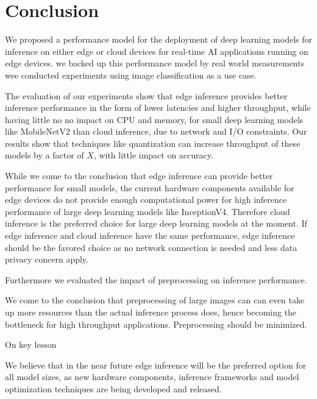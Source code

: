 \chapter{Conclusion}
\label{chap:conclusion}
%
We proposed a performance model for the deployment of deep learning models for inference on either edge or cloud devices for real-time AI applications running on edge devices.
we backed up this performance model by real world measurements wee conducted experiments using image classification as a use case.

The evaluation of our experiments show that edge inference provides better inference performance in the form of lower latencies and higher throughput, while having little no no impact on CPU and memory, for small deep learning models like MobileNetV2 than cloud inference, due to network and I/O constraints. 
Our results show that techniques like quantization can increase throughput of these models by a factor of $X$, with little impact on accuracy.

While we come to the conclusion that edge inference can provide better performance for small models, the current hardware components available for edge devices do not provide enough computational power for high inference performance of large deep learning models like InceptionV4.
Therefore cloud inference is the preferred choice for large deep learning models at the moment.
If edge inference and cloud inference have the same performance, edge inference should be the favored choice as no network connection is needed and less data privacy concern apply.



Furthermore we evaluated the impact of preprocessing on inference performance.



We come to the conclusion that preprocessing of large images can can even take up more resources than the actual inference process does, hence becoming the bottleneck for high throughput applications.
Preprocessing should be minimized.


On key lesson



We believe that in the near future edge inference will be the preferred option for all model sizes, as new hardware components, inference frameworks and model optimization techniques are being developed and released.
